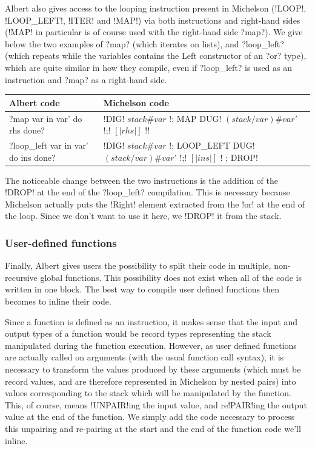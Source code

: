 \documentclass{report}
\begin{document}
Albert also gives access to the looping instruction present in Michelson (!LOOP!, !LOOP_LEFT!, !ITER! and !MAP!) via both instructions and right-hand sides (!MAP! in particular is of course used with the right-hand side ?map?). We give below the two examples of ?map? (which iterates on lists), and ?loop_left? (which repeats while the variables contains the Left constructor of an ?or? type), which are quite similar in how they compile, even if ?loop_left? is used as an instruction and ?map? as a right-hand side.

{\small
\begin{longtable}{p{5cm}|p{11cm}}
  Albert code & Michelson code\\
  \hline
  ?map var in var' do rhs done? & !DIG! $stack\#var$ !; MAP { DUG! $(stack/var)\#var'$ !;! $[|rhs|]$ !}!\\
  \hline
  ?loop_left var in var' do ins done? & !DIG! $stack\#var$ !; LOOP_LEFT { DUG! $(stack/var)\#var'$ !;! $[|ins|]$ !} ; DROP!
\end{longtable}
}

The noticeable change between the two instructions is the addition of the !DROP! at the end of the ?loop_left? compilation. This is necessary because Michelson actually puts the !Right! element extracted from the !or! at the end of the loop. Since we don't want to use it here, we !DROP! it from the stack.

\subsubsection{User-defined functions}
\label{functComp}

Finally, Albert gives users the possibility to split their code in multiple, non-recursive global functions. This possibility does not exist when all of the code is written in one block. The best way to compile user defined functions then becomes to inline their code.

Since a function is defined as an instruction, it makes sense that the input and output types of a function would be record types representing the stack manipulated during the function execution. However, as user defined functions are actually called on arguments (with the usual function call syntax), it is necessary to transform the values produced by these arguments (which must be record values, and are therefore represented in Michelson by nested pairs) into values corresponding to the stack which will be manipulated by the function. This, of course, means !UNPAIR!ing the input value, and re!PAIR!ing the output value at the end of the function. We simply add the code necessary to process this unpairing and re-pairing at the start and the end of the function code we'll inline.\\
\end{document}
